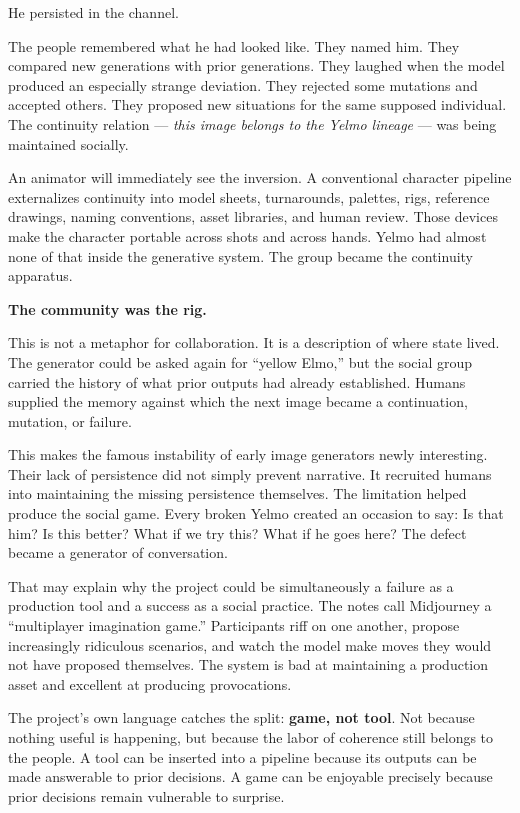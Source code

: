 \documentclass[
]{article}
\begin{document}
He persisted in the channel.

The people remembered what he had looked like. They named him. They
compared new generations with prior generations. They laughed when the
model produced an especially strange deviation. They rejected some
mutations and accepted others. They proposed new situations for the same
supposed individual. The continuity relation --- \emph{this image
belongs to the Yelmo lineage} --- was being maintained socially.

An animator will immediately see the inversion. A conventional character
pipeline externalizes continuity into model sheets, turnarounds,
palettes, rigs, reference drawings, naming conventions, asset libraries,
and human review. Those devices make the character portable across shots
and across hands. Yelmo had almost none of that inside the generative
system. The group became the continuity apparatus.

\textbf{The community was the rig.}

This is not a metaphor for collaboration. It is a description of where
state lived. The generator could be asked again for ``yellow Elmo,'' but
the social group carried the history of what prior outputs had already
established. Humans supplied the memory against which the next image
became a continuation, mutation, or failure.

This makes the famous instability of early image generators newly
interesting. Their lack of persistence did not simply prevent narrative.
It recruited humans into maintaining the missing persistence themselves.
The limitation helped produce the social game. Every broken Yelmo
created an occasion to say: Is that him? Is this better? What if we try
this? What if he goes here? The defect became a generator of
conversation.

That may explain why the project could be simultaneously a failure as a
production tool and a success as a social practice. The notes call
Midjourney a ``multiplayer imagination game.'' Participants riff on one
another, propose increasingly ridiculous scenarios, and watch the model
make moves they would not have proposed themselves. The system is bad at
maintaining a production asset and excellent at producing provocations.

The project's own language catches the split: \textbf{game, not tool}.
Not because nothing useful is happening, but because the labor of
coherence still belongs to the people. A tool can be inserted into a
pipeline because its outputs can be made answerable to prior decisions.
A game can be enjoyable precisely because prior decisions remain
vulnerable to surprise.
\end{document}
